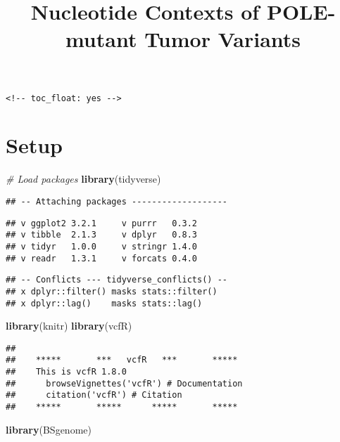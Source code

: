 \documentclass[]{article}
\title{Nucleotide Contexts of POLE-mutant Tumor Variants}
\author{}
\date{}
\newenvironment{Shaded}{\begin{snugshade}}{\end{snugshade}}
\newcommand{\CommentTok}[1]{\textcolor[rgb]{0.56,0.35,0.01}{\textit{#1}}}
\newcommand{\KeywordTok}[1]{\textcolor[rgb]{0.13,0.29,0.53}{\textbf{#1}}}
\newcommand{\NormalTok}[1]{#1}
\begin{document}
\maketitle

{
\setcounter{tocdepth}{2}
\tableofcontents
}
\begin{verbatim}
<!-- toc_float: yes -->
\end{verbatim}

\hypertarget{setup}{%
\section{Setup}\label{setup}}

\begin{Shaded}
\begin{Highlighting}[]
\CommentTok{# Load packages}
\KeywordTok{library}\NormalTok{(tidyverse)}
\end{Highlighting}
\end{Shaded}

\begin{verbatim}
## -- Attaching packages -------------------
\end{verbatim}

\begin{verbatim}
## v ggplot2 3.2.1     v purrr   0.3.2
## v tibble  2.1.3     v dplyr   0.8.3
## v tidyr   1.0.0     v stringr 1.4.0
## v readr   1.3.1     v forcats 0.4.0
\end{verbatim}

\begin{verbatim}
## -- Conflicts --- tidyverse_conflicts() --
## x dplyr::filter() masks stats::filter()
## x dplyr::lag()    masks stats::lag()
\end{verbatim}

\begin{Shaded}
\begin{Highlighting}[]
\KeywordTok{library}\NormalTok{(knitr)}
\KeywordTok{library}\NormalTok{(vcfR)}
\end{Highlighting}
\end{Shaded}

\begin{verbatim}
## 
##    *****       ***   vcfR   ***       *****
##    This is vcfR 1.8.0 
##      browseVignettes('vcfR') # Documentation
##      citation('vcfR') # Citation
##    *****       *****      *****       *****
\end{verbatim}

\begin{Shaded}
\begin{Highlighting}[]
\KeywordTok{library}\NormalTok{(BSgenome)}
\end{Highlighting}
\end{Shaded}
\end{document}
